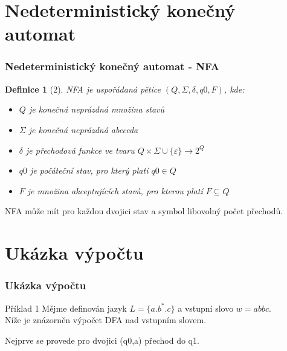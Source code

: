 \documentclass[hyperref={unicode}]{beamer}
\newtheorem*{customdefinition}{Definice}
\begin{document}
\section{Nedeterministický konečný automat}

\begin{frame}
\frametitle{Nedeterministický konečný automat - NFA}

\begin{customdefinition}[2]\label{def:2}
{\normalfont NFA} je uspořádaná pětice $(Q,\Sigma,\delta,q0,F)$, kde:
\begin{itemize}
\item $Q$ je konečná neprázdná množina stavů
\item $\Sigma$ je konečná neprázdná abeceda
\item $\delta$ je přechodová funkce ve tvaru $Q \times \Sigma \cup \{ \varepsilon \} \rightarrow 2^Q$
\item $q0$ je počáteční stav, pro který platí $q0 \in Q$
\item $F$ je množina akceptujících stavů, pro kterou platí $F \subseteq Q$
\end{itemize}
\end{customdefinition}

NFA může mít pro každou dvojici stav a symbol libovolný počet přechodů.

\end{frame}

\section{Ukázka výpočtu}

\begin{frame}
\frametitle{Ukázka výpočtu}

\begin{block}{Příklad 1}
Mějme definován jazyk $L = \{ a.b^*.c \}$ a vstupní slovo $w = abbc$. \\
Níže je znázorněn výpočet DFA nad vstupním slovem.
\end{block}

\begin{center}
\end{center}

Nejprve se provede pro dvojici (q0,a) přechod do q1.

\end{frame}
\end{document}
